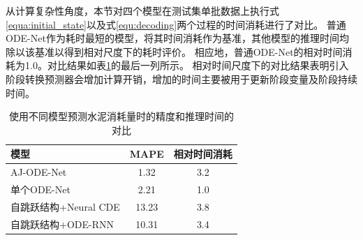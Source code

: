 从计算复杂性角度，本节对四个模型在测试集单批数据上执行式\eqref{equa:initial_state}以及式\eqref{equ:decoding}两个过程的时间消耗进行了对比。
普通ODE-Net作为耗时最短的模型，将其时间消耗作为基准，其他模型的推理时间均除以该基准以得到相对尺度下的耗时评价。
相应地，普通ODE-Net的相对时间消耗为1.0。对比结果如表\ref{tab:paste_model_cmp}的最后一列所示。
相对时间尺度下的对比结果表明引入阶段转换预测器会增加计算开销，增加的时间主要被用于更新阶段变量及阶段持续时间。

\begin{table}[t]
    \centering
    \caption{使用不同模型预测水泥消耗量时的精度和推理时间的对比}
        \begin{tabular}{lcc} 
        \toprule
        模型               & MAPE  & 相对时间消耗  \\ 
        \hline
        AJ-ODE-Net       & 1.32  & 3.2     \\
        单个ODE-Net        & 2.21  & 1.0     \\
        自跳跃结构+Neural CDE & 13.23 & 3.8     \\
        自跳跃结构+ODE-RNN    & 10.31 & 3.4     \\
        \bottomrule
        \end{tabular}
    \label{tab:paste_model_cmp}
    \end{table}





